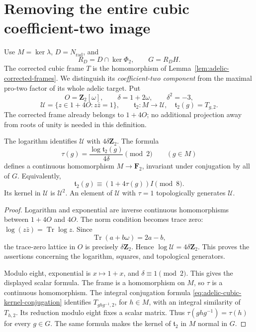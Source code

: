 \section{Removing the entire cubic coefficient-two image}
\label{sec:fr-cubic-coefficient-two}

Use \(M=\ker\lambda\), \(D=N_{\mathrm{rad}}\), and
\[
 R_D=D\cap\ker\Phi_2,\qquad G=R_DH.
\]
The corrected cubic frame \(T\) is the homomorphism of
Lemma~\ref{lem:adelic-corrected-frames}. We distinguish its
\emph{coefficient-two component} from the maximal pro-two factor
of its whole adelic target. Put
\[
 O=\mathbf Z_2[\omega],\qquad
 \delta=1+2\omega,\qquad \delta^2=-3,
\]
\[
 \mathcal U=\{z\in1+4O:z\bar z=1\},\qquad
 \mathfrak t_2:M\longrightarrow\mathcal U,\quad
 \mathfrak t_2(g)=T_{g,2}.
\]
The corrected frame already belongs to \(1+4O\); no additional
projection away from roots of unity is needed in this definition.

\begin{lemma}\label{lem:fr-cubic-two-character}
The logarithm identifies \(\mathcal U\) with
\(4\delta\mathbf Z_2\). The formula
\[
 \tau(g)=\frac{\log\mathfrak t_2(g)}{4\delta}\pmod2
 \qquad(g\in M)
\]
defines a continuous homomorphism \(M\to\mathbf F_2\), invariant
under conjugation by all of \(G\). Equivalently,
\[
 \mathfrak t_2(g)\equiv(1+4\tau(g))I\pmod8.
\]
Its kernel in \(\mathcal U\) is \(\mathcal U^2\). An element of
\(\mathcal U\) with \(\tau=1\) topologically generates \(\mathcal U\).
\end{lemma}

\begin{proof}
Logarithm and exponential are inverse continuous homomorphisms
between \(1+4O\) and \(4O\). The norm condition becomes trace zero:
\(\log(z\bar z)=\operatorname{Tr}\log z\).
Since
\[
 \operatorname{Tr}(a+b\omega)=2a-b,
\]
the trace-zero lattice in \(O\) is precisely
\(\delta\mathbf Z_2\). Hence
\(\log\mathcal U=4\delta\mathbf Z_2\).
This proves the assertions concerning the logarithm, squares, and
topological generators.

Modulo eight, exponential is \(x\mapsto1+x\), and
\(\delta\equiv1\pmod2\). This gives the displayed scalar formula.
The frame is a homomorphism on \(M\), so \(\tau\) is a continuous
homomorphism. The integral conjugation formula
\eqref{eq:adelic-cubic-kernel-conjugation} identifies
\(T_{ghg^{-1},2}\), for \(h\in M\), with an integral similarity
of \(T_{h,2}\). Its reduction modulo eight fixes a scalar matrix.
Thus \(\tau(ghg^{-1})=\tau(h)\) for every \(g\in G\).
The same formula makes the kernel of \(\mathfrak t_2\) in \(M\)
normal in \(G\).
\end{proof}

